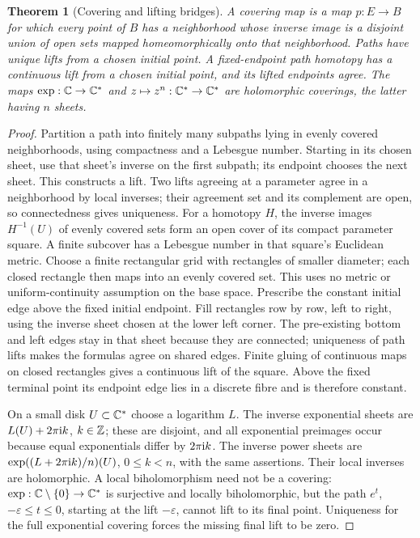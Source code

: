 \documentclass[11pt,a4paper,openany]{book}
\newtheorem{theorem}{Theorem}[chapter]
\theoremstyle{definition}
\theoremstyle{remark}\newtheorem{remark}[theorem]{Remark}
\newcommand{\eps}{\varepsilon}\newcommand{\ee}{\varepsilon}
\newcommand{\family}[1]{}
\begin{document}
\begin{theorem}[Covering and lifting bridges]\label{d12:20-05}\family{D12.20.05}
A covering map is a map $p:E\to B$ for which every point of $B$ has a
neighborhood whose inverse image is a disjoint union of open sets mapped
homeomorphically onto that neighborhood. Paths have unique lifts from a
chosen initial point. A fixed-endpoint path homotopy has a continuous
lift from a chosen initial point, and its lifted endpoints agree.
The maps $\exp:\mathbb C\to\mathbb C^*$ and $z\mapsto z^n:\mathbb C^*\to\mathbb C^*$ are
holomorphic coverings, the latter having $n$ sheets.
\end{theorem}
\begin{proof}
Partition a path into finitely many subpaths lying in evenly covered
neighborhoods, using compactness and a Lebesgue number. Starting in its
chosen sheet, use that sheet's inverse on the first subpath; its endpoint
chooses the next sheet. This constructs a lift. Two lifts agreeing at a
parameter agree in a neighborhood by local inverses; their agreement set
and its complement are open, so connectedness gives uniqueness.
For a homotopy $H$, the inverse images $H^{-1}(U)$ of evenly covered
sets form an open cover of its compact parameter square. A finite
subcover has a Lebesgue number in that square's Euclidean metric.
Choose a finite rectangular grid with rectangles of smaller diameter;
each closed rectangle then maps into an evenly covered set. This uses
no metric or uniform-continuity assumption on the base space.
Prescribe the constant initial edge above the fixed initial endpoint.
Fill rectangles row by row, left to right, using the inverse sheet chosen
at the lower left corner. The pre-existing bottom and left edges stay
in that sheet because they are connected; uniqueness of path lifts makes
the formulas agree on shared edges. Finite gluing of continuous maps on
closed rectangles gives a continuous lift of the square. Above the fixed
terminal point its endpoint edge lies in a discrete fibre and is therefore
constant.

On a small disk $U\subset\mathbb C^*$ choose a logarithm $L$. The inverse
exponential sheets are $L(U)+2\pi\mathrm i k$, $k\in\mathbb Z$; these are disjoint,
and all exponential preimages occur because equal exponentials differ by
$2\pi\mathrm i k$. The inverse power sheets are
$\exp((L+2\pi\mathrm i k)/n)(U)$, $0\le k<n$, with the same assertions.
Their local inverses are holomorphic. A local biholomorphism need not
be a covering: $\exp:\mathbb C\setminus\{0\}\to\mathbb C^*$ is surjective and locally
biholomorphic, but the path $e^t$, $-\eps\le t\le0$, starting at the
lift $-\eps$, cannot lift to its final point. Uniqueness for the full
exponential covering forces the missing final lift to be zero.
\end{proof}
\end{document}
